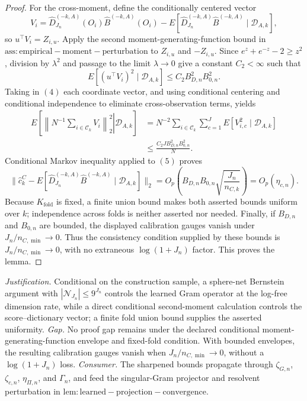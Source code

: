 \documentclass{article}
\begin{document}
\begin{proof}
For the cross-moment, define the conditionally centered vector
\[
 V_i=\widehat D_{J_n}^{(-k,A)}(O_i)\widehat B^{(-k,A)}(O_i)
 -E[\widehat D_{J_n}^{(-k,A)}\widehat B^{(-k,A)}\mid\mathcal D_{A,k}],
\]
so \(u^\top V_i=Z_{i,u}\).  Apply the second moment-generating-function bound in \(\mathrm{ass:empirical-moment-perturbation}\) to \(Z_{i,u}\) and \(-Z_{i,u}\).  Since \(e^z+e^{-z}-2\ge z^2\), division by \(\lambda^2\) and passage to the limit \(\lambda\to0\) give a constant \(C_2<\infty\) such that
\[
 E[(u^\top V_i)^2\mid\mathcal D_{A,k}]
 \le C_2B_{D,n}^2B_{0,n}^2. \tag{4}
\]
Taking in \((4)\) each coordinate vector, and using conditional centering and conditional independence to eliminate cross-observation terms, yields
\[
 \begin{aligned}
 E\!\left[\left.\left\|N^{-1}\sum_{i\in\mathcal C_k}V_i\right\|_2^2
 \right|\mathcal D_{A,k}\right]
 &=N^{-2}\sum_{i\in\mathcal C_k}\sum_{c=1}^J
 E[V_{i,c}^2\mid\mathcal D_{A,k}]\\
 &\le \frac{C_2JB_{D,n}^2B_{0,n}^2}{N}.
 \end{aligned} \tag{5}
\]
Conditional Markov inequality applied to \((5)\) proves
\[
 \|\widehat c_k^C-E[\widehat D_{J_n}^{(-k,A)}\widehat B^{(-k,A)}
 \mid\mathcal D_{A,k}]\|_2
 =O_p\!\left(B_{D,n}B_{0,n}\sqrt{\frac{J_n}{n_{C,k}}}\right)
 =O_p(\eta_{c,n}).
\]
Because \(K_{\mathrm{fold}}\) is fixed, a finite union bound makes both asserted bounds uniform over \(k\); independence across folds is neither asserted nor needed.  Finally, if \(B_{D,n}\) and \(B_{0,n}\) are bounded, the displayed calibration gauges vanish under \(J_n/n_{C,\min}\to0\).  Thus the consistency condition supplied by these bounds is \(J_n/n_{C,\min}\to0\), with no extraneous \(\log(1+J_n)\) factor.  This proves the lemma.
\end{proof}
\par\smallskip\noindent \textit{Justification.} Conditional on the construction sample, a sphere-net Bernstein argument with \(|\mathcal N_{J_n}|\le9^{J_n}\) controls the learned Gram operator at the log-free dimension rate, while a direct conditional second-moment calculation controls the score--dictionary vector; a finite fold union bound supplies the asserted uniformity. \textit{Gap.} No proof gap remains under the declared conditional moment-generating-function envelope and fixed-fold condition. With bounded envelopes, the resulting calibration gauges vanish when \(J_n/n_{C,\min}\to0\), without a \(\log(1+J_n)\) loss. \textit{Consumer.} The sharpened bounds propagate through \(\zeta_{G,n}\), \(\zeta_{c,n}\), \(\eta_{\Pi,n}\), and \(\Gamma_n\), and feed the singular-Gram projector and resolvent perturbation in \(\mathrm{lem:learned-projection-convergence}\).
\end{document}
